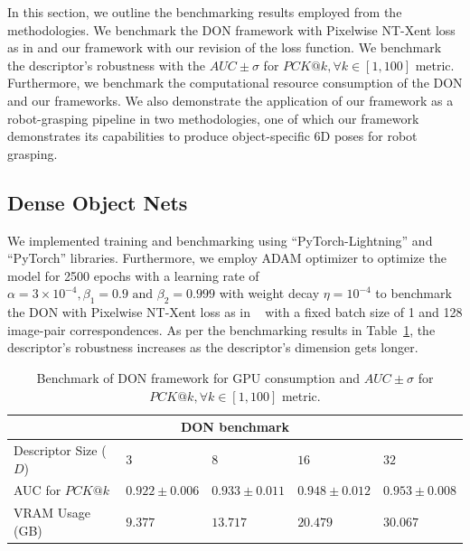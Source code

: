 In this section, we outline the benchmarking results employed from the methodologies.
We benchmark the DON framework with Pixelwise NT-Xent loss as in \cite{adrian2022efficient} and our framework
with our revision of the loss function. We benchmark the descriptor's robustness
with the $AUC \pm \sigma$ for $PCK@k, \forall k \in [1, 100]$ metric.
Furthermore, we benchmark the computational resource consumption of the DON and our frameworks.
We also demonstrate the application of our framework as a robot-grasping pipeline in two methodologies,
one of which our framework demonstrates its capabilities to produce object-specific 6D poses for robot grasping.


\subsection{Dense Object Nets}
We implemented training and benchmarking using ``PyTorch-Lightning''\cite{falcon2019pytorch} and ``PyTorch''\cite{paszke2019pytorch} libraries.
Furthermore, we employ
ADAM\cite{kingma2014adam} optimizer to optimize the model for 2500 epochs with a learning rate of
$\alpha = 3 \times 10^{-4}, \beta_1 = 0.9 \text{ and } \beta_2 = 0.999$ with weight decay $\eta =10^{-4}$ to benchmark the DON with Pixelwise NT-Xent loss as in ~\cite{adrian2022efficient}
with a fixed batch size of 1 and 128 image-pair correspondences.
As per the benchmarking results in Table~\ref{table:don_training_results}, the descriptor's robustness increases as the descriptor's dimension gets longer.

\begin{table}[htb]
    \caption{Benchmark of DON framework for GPU consumption and $AUC \pm \sigma$ for $PCK@k,  \forall k \in [1, 100]$ metric.}
    \label{table:don_training_results}
    \centering
    \begin{tabular}{lllll}
        \toprule
        \multicolumn{5}{c}{DON benchmark}                                                                     \\
        \midrule
        Descriptor Size ($D$) & $3 $              & $8 $              & $16 $             & $32$              \\
        AUC for $PCK@k$       & $0.922 \pm 0.006$ & $0.933 \pm 0.011$ & $0.948 \pm 0.012$ & $0.953 \pm 0.008$ \\
        VRAM Usage (GB)       & $9.377 $          & $13.717 $         & $20.479 $         & $30.067$          \\
        \bottomrule
    \end{tabular}
\end{table}

